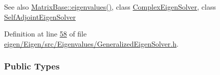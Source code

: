 \begin{DoxySeeAlso}{See also}
\hyperlink{group___core___module_a30430fa3d5b4e74d312fd4f502ac984d}{Matrix\+Base\+::eigenvalues()}, class \hyperlink{group___eigenvalues___module_class_eigen_1_1_complex_eigen_solver}{Complex\+Eigen\+Solver}, class \hyperlink{group___eigenvalues___module_class_eigen_1_1_self_adjoint_eigen_solver}{Self\+Adjoint\+Eigen\+Solver} 
\end{DoxySeeAlso}


Definition at line \hyperlink{eigen_2_eigen_2src_2_eigenvalues_2_generalized_eigen_solver_8h_source_l00058}{58} of file \hyperlink{eigen_2_eigen_2src_2_eigenvalues_2_generalized_eigen_solver_8h_source}{eigen/\+Eigen/src/\+Eigenvalues/\+Generalized\+Eigen\+Solver.\+h}.

\subsubsection*{Public Types}
